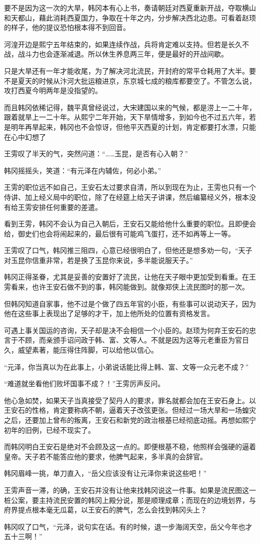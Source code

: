要不是因为这一次的大旱，韩冈本有心上书，奏请朝廷对西夏重新开战，夺取横山和天都山，藉此消耗西夏国力，争取在十年之内，分步解决西北边患。可看着赵顼的样子，他的提议恐怕根本得不到回音。

河湟开边是熙宁五年结束的，如果连续作战，兵将肯定难以支持。但若是长久不战，战斗力也会逐渐减退。所以休生养息两三年，便是最好的开战间歇。

只是大旱还有一年才能收尾，为了解决河北流民，开封府的常平仓耗用了大半。要不是夏天的时候从汴河大批运粮进京，东京城七成的粮库都要空了。不管怎么说，攻打西夏今明两年是没指望的。

而且韩冈依稀记得，魏平真曾经说过，大宋建国以来的气候，都是涝上一二十年，跟着就旱上一二十年。从熙宁二年开始，天下旱情增多，到如今也不过五六年，若是明年再旱起来，韩冈也不会惊讶，但他平灭西夏的计划，肯定都要打水漂，只能在心中幻想了

王雱叹了半天的气，突然问道：“……玉昆，是否有心入朝？”

韩冈摇摇头，笑道：“有元泽在内辅佐，何必小弟。”

王雱的职位远不如自己，王安石太过要求自清，所以到现在为止，王雱也只有一个侍讲、加上经义局中的职位，除了在经筵上给天子讲课，然后编纂经义外，根本没有给王雱安排任何重要的差遣。

看到王雱，韩冈不会认为自己入朝后，王安石又能给他什么重要的职位。且即便会给，御史们也会将闹起来的，最后很有可能鸡飞蛋打，还不如再等上一等。

王雱叹了口气，韩冈推三阻四，心意已经很明白了，但他还是想多劝一句，“天子对玉昆你信重非常，若是换了玉昆你来说，多半能说服天子。”

韩冈正得圣眷，尤其是妥善的安置好了流民，让他在天子眼中更加受到看重。在王雱看来，也许王安石做不到的事，韩冈能做到。就像郑侠上流民图时的那一次。

但韩冈知道自家事，他不过是个做了四五年官的小臣，有些事可以说动天子，因为他在这些事上表现出了足够的才干，加上他所处的位置有资格发言。

可遇上事关国运的咨询，天子却是决不会相信一个小臣的。赵顼为何弃王安石的忠言于不顾，而亲颁手诏问政于韩、富、文等人。不就是因为这等元老重臣为官日久，威望素著，能压得住阵脚，可以给他以信心。

“元泽，你当真以为在此事上，小弟说话能比得上韩、富、文等一众元老不成？”

“难道就坐看他们败坏国事不成？！”王雱厉声反问。

他心急如焚，如果天子当真接受了契丹人的要求，罪名就都会加在王安石身上。以王安石的性格，肯定要称病不朝，逼着天子改弦更张。但经过一场大旱和一场蝗灾之后，还要加上曾布的叛离，王安石和新党的政治根基已经彻底动摇。再想如熙宁初年的旧例，已经不现实了。

而韩冈明白王安石是绝对不会顾及这一点的。即便根基不稳，他照样会强硬的逼着皇帝。天子若不能答应他的要求，他脾气起来，多半真的会辞官。

韩冈眉峰一挑，单刀直入，“岳父应该没有让元泽你来说这些吧！”

王雱声音一滞，的确，王安石并没有让他来找韩冈说这一件事。如果是流民图这一桩公案，要主持流民安置的韩冈上殿分说，那是顺理成章；而现在的边境划界，与府界提点根本毫无瓜葛，以王安石的脾气，怎么会找到韩冈头上？

韩冈叹了口气，“元泽，说句实在话。有的时候，退一步海阔天空，岳父今年也才五十三啊！”

